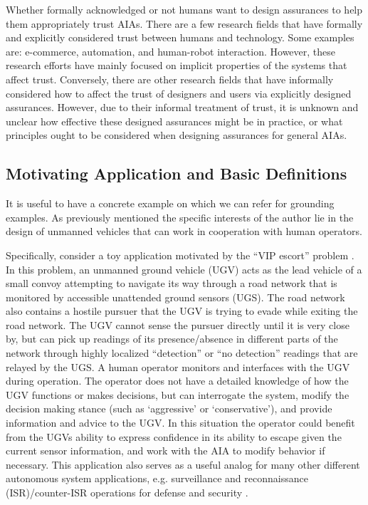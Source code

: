     Whether formally acknowledged or not humans want to design assurances to help them appropriately trust AIAs. There are a few research fields that have formally and explicitly considered trust between humans and technology. Some examples are: e-commerce, automation, and human-robot interaction. However, these research efforts have mainly focused on implicit properties of the systems that affect trust. Conversely, there are other research fields that have informally considered how to affect the trust of designers and users via explicitly designed assurances. However, due to their informal treatment of trust, it is unknown and unclear how effective these designed assurances might be in practice, or what principles ought to be considered when designing assurances for general AIAs. 

\subsection{Motivating Application and Basic Definitions} \label{sec:mot_example}
    It is useful to have a concrete example on which we can refer for grounding examples. As previously mentioned the specific interests of the author lie in the design of unmanned vehicles that can work in cooperation with human operators.

    Specifically, consider a toy application motivated by the ``VIP escort'' problem \cite{Humphrey2012-lr}. In this problem, an unmanned ground vehicle (UGV) acts as the lead vehicle of a small convoy attempting to navigate its way through a road network that is monitored by accessible unattended ground sensors (UGS). The road network also contains a hostile pursuer that the UGV is trying to evade while exiting the road network. The UGV cannot sense the pursuer directly until it is very close by, but can pick up readings of its presence/absence in different parts of the network through highly localized ``detection'' or ``no detection'' readings that are relayed by the UGS. A human operator monitors and interfaces with the UGV during operation. The operator does not have a detailed knowledge of how the UGV functions or makes decisions, but can interrogate the system, modify the decision making stance (such as `aggressive' or `conservative'), and provide information and advice to the UGV. In this situation the operator could benefit from the UGVs ability to express confidence in its ability to escape given the current sensor information, and work with the AIA to modify behavior if necessary. This application also serves as a useful analog for many other different autonomous system applications, e.g. surveillance and reconnaissance (ISR)/counter-ISR operations for defense and security \cite{Kingston2012-va}.
   
